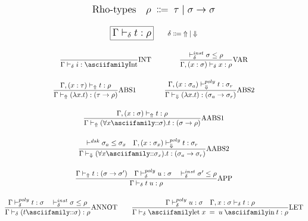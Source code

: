 \begin{figure}[h]
  \begin{tcolorbox}[breakable, colback=white]
    \small
    \begin{gather*}
      \mlg{\text{Rho-types} \quad \rho \Qquad \Coloneqq \Qquad \tau \mid \sigma \to \sigma}
      \\[\bigskipamount]
      \boxed{\mlg{\Gamma \vdash_\delta \mexp{t} : \rho}} \qquad \delta \Coloneqq \Qquad \Uparrow \Qquad \mid \Qquad \Downarrow
      \\[\bigskipamount]
      \frac{}{\Gamma \vdash_\delta \mexp{i} : \msyn{Int}} \text{INT}
      \qquad \qquad
      \frac{\mexp{\vdash_\delta^{inst} \sigma \leq \rho}}{\Gamma, \mexp{(x:\sigma) \vdash_\delta x : \rho}} \text{VAR}
      \\[\bigskipamount]
      \frac{\Gamma, \mexp{(x:\tau) \vdash_\Uparrow \mexp{t} : \rho}}{\Gamma \Qquad \mexp{\vdash_\Uparrow (\lambda x.t) : (\tau \to \rho)}} \text{ABS1}
      \qquad \qquad
      \frac{\Gamma, \mexp{(x:\sigma_a) \vdash_\Downarrow^{poly} t : \sigma_r}}{\Gamma \Qquad \mexp{\vdash_\Downarrow (\lambda x.t) : (\sigma_a \to \sigma_r)}} \text{ABS2}
      \\[\bigskipamount]
      \frac{\Gamma, \mexp{(x:\sigma) \vdash_\Uparrow t : \rho}}{\Gamma \Qquad \mexp{\vdash_\Uparrow (\forall x \msyn{::} \sigma).t : (\sigma \to \rho)}} \text{AABS1}
      \\[\bigskipamount]
      \frac{\mexp{\vdash^{dsk} \sigma_a \leq \sigma_x} \quad \Gamma, \mexp{(x:\sigma_x) \vdash_\Downarrow^{poly} t : \sigma_r}}{\Gamma \Qquad \mexp{\vdash_\Downarrow (\forall x \msyn{::} \sigma_x).t : (\sigma_a \to \sigma_r)}} \text{AABS2}
      \\[\bigskipamount]
      \frac{\Gamma \Qquad \mexp{\vdash_\Uparrow t : (\sigma \to \sigma')} \quad \Gamma \Qquad \mexp{\vdash_\delta^{poly} u : \sigma \quad \vdash_\delta^{inst} \sigma' \leq \rho}}{\Gamma \Qquad \mexp{\vdash_\delta t \Qquad u : \rho}} \text{APP}
      \\[\bigskipamount]
      \frac{\Gamma \Qquad \mexp{\vdash_\delta^{poly} t : \sigma \quad \vdash_\delta^{inst} \sigma \leq \rho}}{\Gamma \Qquad \mexp{\vdash_\delta (t \msyn{::} \sigma) : \rho}} \text{ANNOT}
      \qquad
      \frac{\Gamma \Qquad \mexp{\vdash_\delta^{poly} u : \sigma} \quad \Gamma, \mexp{x:\sigma \vdash_\delta t : \rho}}{\Gamma \vdash_\delta \msyn{let} \Qquad \mexp{x} \Qquad = \Qquad \mexp{u} \Qquad \msyn{in} \Qquad \mexp{t : \rho}} \text{LET}

\end{gather*}
\end{tcolorbox}
\end{figure}
